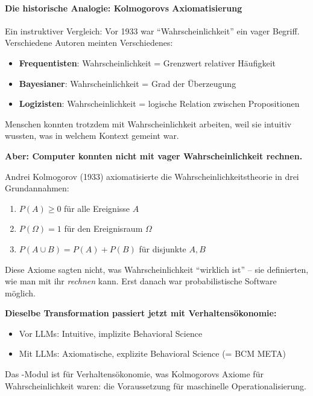 \paragraph{Die historische Analogie: Kolmogorovs Axiomatisierung}

Ein instruktiver Vergleich: Vor 1933 war ``Wahrscheinlichkeit'' ein vager Begriff. Verschiedene Autoren meinten Verschiedenes:
\begin{itemize}
    \item \textbf{Frequentisten}: Wahrscheinlichkeit = Grenzwert relativer Häufigkeit
    \item \textbf{Bayesianer}: Wahrscheinlichkeit = Grad der Überzeugung
    \item \textbf{Logizisten}: Wahrscheinlichkeit = logische Relation zwischen Propositionen
\end{itemize}

Menschen konnten trotzdem mit Wahrscheinlichkeit arbeiten, weil sie intuitiv wussten, was in welchem Kontext gemeint war.

\textbf{Aber: Computer konnten nicht mit vager Wahrscheinlichkeit rechnen.}

Andrei Kolmogorov (1933) axiomatisierte die Wahrscheinlichkeitstheorie in drei Grundannahmen:
\begin{enumerate}
    \item $P(A) \geq 0$ für alle Ereignisse $A$
    \item $P(\Omega) = 1$ für den Ereignisraum $\Omega$
    \item $P(A \cup B) = P(A) + P(B)$ für disjunkte $A, B$
\end{enumerate}

Diese Axiome sagten nicht, was Wahrscheinlichkeit ``wirklich ist'' -- sie definierten, wie man mit ihr \textit{rechnen} kann. Erst danach war probabilistische Software möglich.

\textbf{Dieselbe Transformation passiert jetzt mit Verhaltensökonomie:}
\begin{itemize}
    \item Vor LLMs: Intuitive, implizite Behavioral Science
    \item Mit LLMs: Axiomatische, explizite Behavioral Science (= BCM META)
\end{itemize}

Das \META-Modul ist für Verhaltensökonomie, was Kolmogorovs Axiome für Wahrscheinlichkeit waren: die Voraussetzung für maschinelle Operationalisierung.


